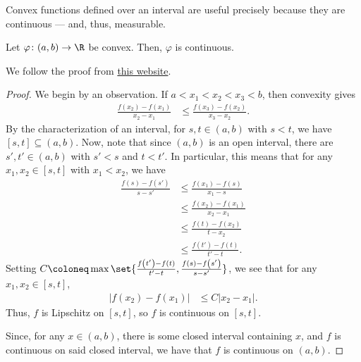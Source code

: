 \documentclass[12pt]{mypackage}
\begin{document}
Convex functions defined over an interval are useful precisely because they are continuous --- and, thus, measurable.
\begin{theorem}
  Let $\varphi\colon (a,b)\rightarrow \R$ be convex. Then, $\varphi$ is continuous.
\end{theorem}
We follow the proof from \href{https://unapologetic.wordpress.com/2008/04/15/convex-functions-are-continuous/}{this website}.
\begin{proof}
  We begin by an observation. If $a < x_1 < x_2 < x_3 < b$, then convexity gives
  \begin{align*}
    \frac{f\left( x_2 \right)- f\left( x_1 \right)}{x_2 - x_1} &\leq \frac{f\left( x_3 \right)-f\left( x_2 \right)}{x_3 - x_2}. \label{eq:convexity_fraction_inequality}\tag{\textasteriskcentered}
  \end{align*}
  By the characterization of an interval, for $s , t\in \left( a,b \right)$ with $s < t$, we have $\left[ s,t \right]\subseteq \left( a,b \right)$. Now, note that since $\left( a,b \right)$ is an open interval, there are $s',t'\in \left( a,b \right)$ with $s' < s$ and $t < t'$. In particular, this means that for any $x_1,x_2\in \left[ s,t \right]$ with $x_1 < x_2$, we have
  \begin{align*}
    \frac{f\left( s \right) - f\left( s' \right)}{s-s'} &\leq \frac{f\left( x_1 \right) - f\left( s \right)}{x_1 - s}\\
                                                        &\leq \frac{f\left( x_2 \right) - f\left( x_1 \right)}{x_2 - x_1}\\
                                                        &\leq  \frac{f\left( t \right) - f\left( x_2 \right)}{t-x_2}\\
                                                        &\leq \frac{f\left( t' \right)-f\left( t \right)}{t'-t}.
  \end{align*}
  Setting $C\coloneq \max\set{\frac{f\left( t' \right)-f\left( t \right)}{t'-t},\frac{f\left( s \right)-f\left( s' \right)}{s-s'}}$, we see that for any $x_1,x_2\in \left[ s,t \right]$,
  \begin{align*}
    \left\vert f\left( x_2 \right)-f\left( x_1 \right) \right\vert &\leq C \left\vert x_2 - x_1 \right\vert.
  \end{align*}
  Thus, $f$ is Lipschitz on $\left[ s,t \right]$, so $f$ is continuous on $\left[ s,t \right]$.\newline

  Since, for any $x\in \left( a,b \right)$, there is some closed interval containing $x$, and $f$ is continuous on said closed interval, we have that $f$ is continuous on $\left( a,b \right)$.
\end{proof}
\end{document}
